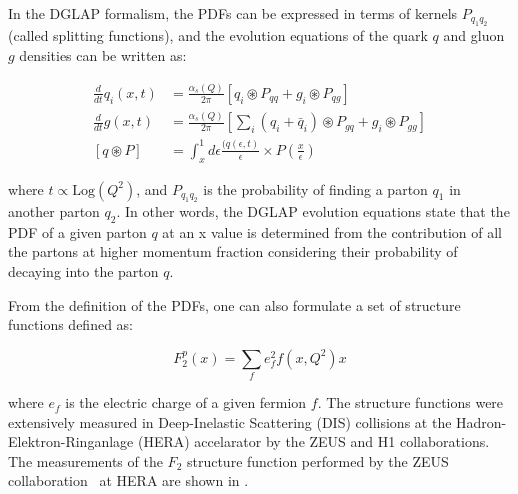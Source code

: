 In the DGLAP formalism, the PDFs can be expressed in terms of kernels $P_{q_{1}q_{2}}$ (called splitting functions), and the evolution equations of the quark $q$ and gluon $g$ densities can be written as:

\begin{equation}
  \begin{alignedat}{1}
    \frac{d}{dt}q_{i}\left(x,t\right) &= \frac{\alpha_{s}\left(Q\right)}{2\pi}\left[q_{i}\circledast{P_{qq}} + g_{i}\circledast{P_{qg}}\right] \\
    \frac{d}{dt}g\left(x,t\right) &= \frac{\alpha_{s}\left(Q\right)}{2\pi}\left[\sum_{i}\left(q_{i}+\bar{q}_{i}\right)\circledast{P_{gq}} + g_{i}\circledast{P_{gg}}\right] \\
    \left[q\circledast{P}\right] &= \int_{x}^{1}d\epsilon\frac{(q\left(\epsilon,t\right)}{\epsilon}\times{P\left(\frac{x}{\epsilon}\right)}
  \end{alignedat}
  \label{eq:DGLAP}
\end{equation}

where $t \propto \mathrm{Log}\left(Q^{2}\right)$, and $P_{q_{1}q_{2}}$ is the probability of finding a parton $q_{1}$ in another parton $q_{2}$. In other words, the DGLAP evolution equations state that the PDF of a given parton $q$ at an x value is determined from the contribution of all the partons at higher momentum fraction considering their probability of decaying into the parton $q$.

From the definition of the PDFs, one can also formulate a set of structure functions defined as:

\begin{equation}
F^{p}_{2}\left(x\right) = \sum_{f}e_{f}^{2}f\left(x,Q^{2}\right)x
\end{equation}

where $e_{f}$ is the electric charge of a given fermion $f$. The structure functions were extensively measured in Deep-Inelastic Scattering (DIS) collisions at the Hadron-Elektron-Ringanlage (HERA) accelarator by the ZEUS and H1 collaborations. The measurements of the $F_{2}$ structure function performed by the ZEUS collaboration~\cite{HERAStrucFunc} at HERA are shown in .

